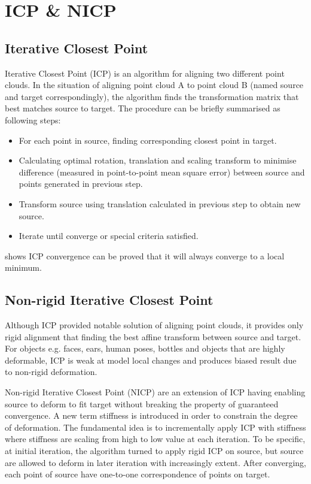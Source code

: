 \section{ICP \& NICP}
\label{sec:bg_icp}
\subsection{Iterative Closest Point}
Iterative Closest Point (ICP) is an algorithm for aligning two different point clouds\cite{Besl1992}. In the situation of aligning point cloud A to point cloud B (named source and target correspondingly), the algorithm finds the transformation matrix that best matches source to target. The procedure can be briefly summarised as following steps:
\begin{itemize}
  \item For each point in source, finding corresponding closest point in target.
  \item Calculating optimal rotation, translation and scaling transform to minimise difference (measured in point-to-point mean square error) between source and points generated in previous step.
  \item Transform source using translation calculated in previous step to obtain new source.
  \item Iterate until converge or special criteria satisfied.
\end{itemize}
\cite{Besl1992} shows ICP convergence can be proved that it will always converge to a local minimum.

\subsection{Non-rigid Iterative Closest Point}
Although ICP provided notable solution of aligning point clouds, it provides only rigid alignment that finding the best affine transform between source and target. For objects e.g. faces, ears, human poses, bottles and objects that are highly deformable, ICP is weak at model local changes and produces biased result due to non-rigid deformation.

Non-rigid Iterative Closest Point (NICP) are an extension of ICP having enabling source to deform to fit target without breaking the property of guaranteed convergence\cite{Amberg2007}. A new term stiffness is introduced in order to constrain the degree of deformation. The fundamental idea is to incrementally apply ICP with stiffness where stiffness are scaling from high to low value at each iteration. To be specific, at initial iteration, the algorithm turned to apply rigid ICP on source, but source are allowed to deform in later iteration with increasingly extent. After converging, each point of source have one-to-one correspondence of points on target.

